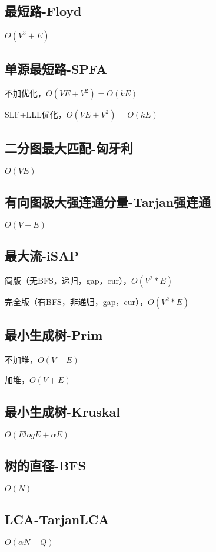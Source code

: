 \documentclass[10pt]{article}
\begin{document}
\subsection{最短路-Floyd}
$O(V^3+E)$


\subsection{单源最短路-SPFA}
不加优化，$O(VE+V^2)=O(kE)$

SLF+LLL优化，$O(VE+V^2)=O(kE)$


\subsection{二分图最大匹配-匈牙利}
$O(VE)$


\subsection{有向图极大强连通分量-Tarjan强连通}
$O(V+E)$


\subsection{最大流-iSAP}
简版（无BFS，递归，gap，cur），$O(V^2*E)$

完全版（有BFS，非递归，gap，cur），$O(V^2*E)$


\subsection{最小生成树-Prim}
不加堆，$O(V+E)$

加堆，$O(V+E)$


\subsection{最小生成树-Kruskal}
$O(ElogE+αE)$


\subsection{树的直径-BFS}
$O(N)$


\subsection{LCA-TarjanLCA}
$O(αN+Q)$

\end{document}
